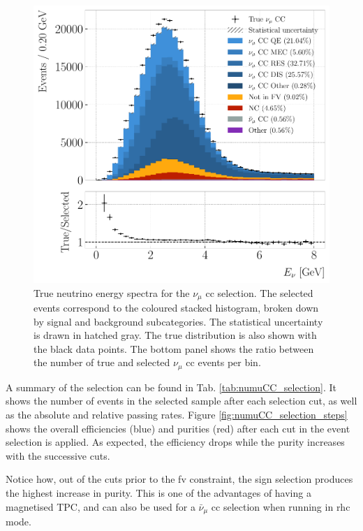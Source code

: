 \begin{figure}[t]
	\centering
	\includegraphics[width=.80\linewidth]{Images/GAr_selection/numuCC_selection_true_energy.pdf}
	\caption[True neutrino energy spectra for the $\nu_{\mu}$ \gls{cc} selection.]{True neutrino energy spectra for the $\nu_{\mu}$ \gls{cc} selection. The selected events correspond to the coloured stacked histogram, broken down by signal and background subcategories. The statistical uncertainty is drawn in hatched gray. The true distribution is also shown with the black data points. The bottom panel shows the ratio between the number of true and selected $\nu_{\mu}$ \gls{cc} events per bin.}
	\label{fig:numuCC_selection_true_enu}
\end{figure}

A summary of the selection can be found in Tab. \ref{tab:numuCC_selection}. It shows the number of events in the selected sample after each selection cut, as well as the absolute and relative passing rates. Figure \ref{fig:numuCC_selection_steps} shows the overall efficiencies (blue) and purities (red) after each cut in the event selection is applied. As expected, the efficiency drops while the purity increases with the successive cuts.

Notice how, out of the cuts prior to the \gls{fv} constraint, the sign selection produces the highest increase in purity. This is one of the advantages of having a magnetised TPC, and can also be used for a $\bar{\nu}_{\mu}$ \gls{cc} selection when running in \gls{rhc} mode.

